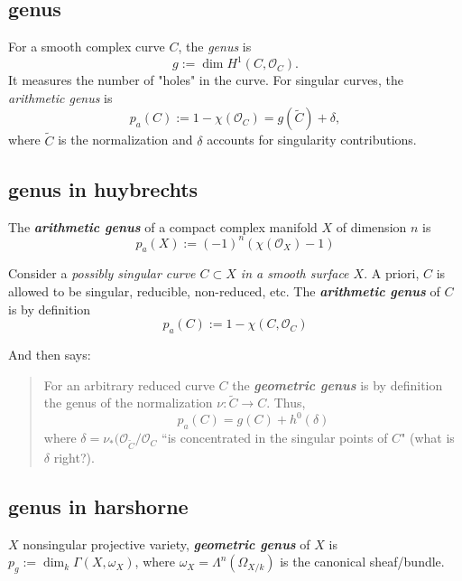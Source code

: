 \subsection{genus}
For a smooth complex curve \( C \), the \emph{genus} is
\[
g := \dim H^1(C, \mathcal{O}_C).
\]
It measures the number of "holes" in the curve. For singular curves, the \emph{arithmetic genus} is
\[
p_a(C) := 1 - \chi(\mathcal{O}_C) = g(\widetilde{C}) + \delta,
\]
where \( \widetilde{C} \) is the normalization and \( \delta \) accounts for singularity contributions.

\subsection*{genus in huybrechts}
\begin{defn}\leavevmode
The \textit{\textbf{arithmetic genus}} of a compact complex manifold \(X\) of dimension \(n\) is
\[\boxed{p_a(X):=(-1)^n (\chi(\mathcal{O}_X)-1)}\]
\end{defn}

\begin{defn}\leavevmode
	Consider a \textit{possibly singular curve \(C \subset X\) in a smooth surface \(X\)}. A priori, \(C\) is allowed to be singular, reducible, non-reduced, etc. The \textit{\textbf{arithmetic genus}} of \(C\) is by definition
	\[\boxed{p_a(C):= 1 - \chi(C, \mathcal{O}_C)}\]
\end{defn}

And then \cite{huk} says:
\begin{quotation}
For an arbitrary reduced curve \(C\) the \textit{\textbf{geometric genus}} is by definition the genus of the normalization \(\nu:\tilde{C} \to C\). Thus, \[\boxed{p_a(C)=g(C)+h^{0}(\delta)}\]
where \(\delta=\nu_*(\mathcal{O}_{\tilde{C}}/\mathcal{O}_C\) ``is concentrated in the singular points of \(C\)" (what is \(\delta\) right?).
\end{quotation}

\subsection*{genus in harshorne}
\begin{defn}\leavevmode
\(X\) nonsingular projective variety, \textit{\textbf{geometric genus}} of \(X\) is \(p_g:=\dim_k\Gamma(X,\omega_X)\), where \(\omega_X=\Lambda^{n}(\Omega_{X/k})\) is the canonical sheaf/bundle.
\end{defn}

